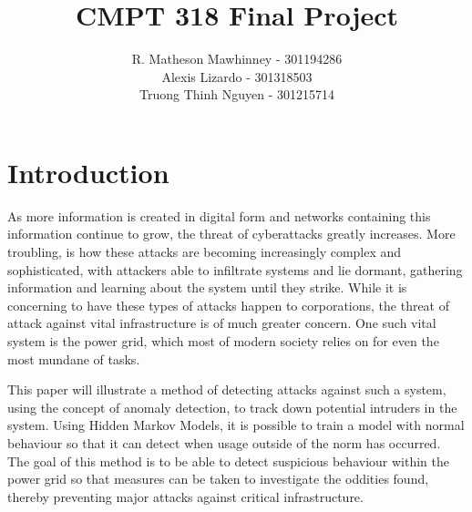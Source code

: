 \documentclass[letterpaper, 11pt]{article}%
\begin{document}
\title{\textbf{CMPT 318 Final Project}}
\author{R. Matheson Mawhinney - 301194286 \\ Alexis Lizardo - 301318503 \\ Truong Thinh Nguyen - 301215714}

\maketitle


\newpage
\tableofcontents
\newpage
\listoffigures
\newpage

\section{Introduction}
  As more information is created in digital form and networks containing this information continue to grow, the threat of cyberattacks greatly increases. More troubling, is how these attacks are becoming increasingly complex and sophisticated, with attackers able to infiltrate systems and lie dormant, gathering information and learning about the system until they strike. While it is concerning to have these types of attacks happen to corporations, the threat of attack against vital infrastructure is of much greater concern. One such vital system is the power grid, which most of modern society relies on for even the most mundane of tasks.

This paper will illustrate a method of detecting attacks against such a system, using the concept of anomaly detection, to track down potential intruders in the system. Using Hidden Markov Models, it is possible to train a model with normal behaviour so that it can detect when usage outside of the norm has occurred. The goal of this method is to be able to detect suspicious behaviour within the power grid so that measures can be taken to investigate the oddities found, thereby preventing major attacks against critical infrastructure.
\end{document}
